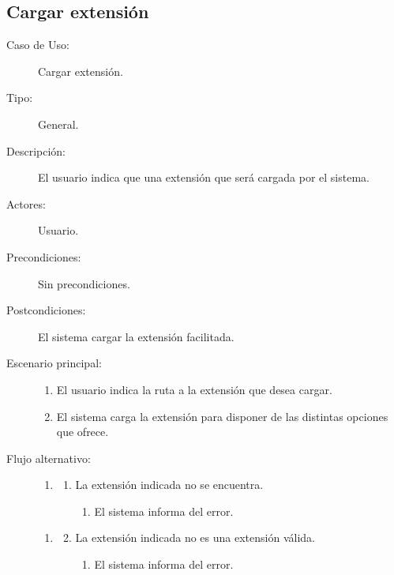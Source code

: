 \subsection{Cargar extensión}
\begin{framed}
\FloatBarrier
\begin{description}
   \item[Caso de Uso:]  Cargar extensión.
   \item[Tipo:] General.
   \item[Descripción:] 
   El usuario indica que una extensión que será cargada por
   el sistema.
   \item[Actores:] 
   Usuario.
   \item[Precondiciones:] 
   Sin precondiciones.
   \item[Postcondiciones:] 
   El sistema cargar la extensión facilitada.
   \item[Escenario principal:] \hfill
   \begin{enumerate}
   \item El usuario indica la ruta a la extensión que desea cargar.
   \item El sistema carga la extensión para disponer de las distintas opciones que 
   ofrece. 
   \end{enumerate}
   \item[Flujo alternativo:] \hfill 
   \begin{enumerate} \itemsep1pt \parskip0pt 
   \setcounter{enumi}{1}
   \renewcommand{\labelenumi}{}
   \renewcommand{\labelenumiii}{\arabic{enumiii}.}
   \renewcommand{\labelenumii}{\arabic{enumi}\alph{enumii}.}
      \item 
      \begin {enumerate}
         \setcounter{enumii}{0}
         \item La extensión indicada no se encuentra.
         \begin{enumerate}
         \item El sistema informa del error.
         \end{enumerate}
      \end{enumerate}
   \end{enumerate}
   \begin{enumerate} \itemsep1pt \parskip0pt 
   \setcounter{enumi}{1}
   \renewcommand{\labelenumi}{}
   \renewcommand{\labelenumiii}{\arabic{enumiii}.}
   \renewcommand{\labelenumii}{\arabic{enumi}\alph{enumii}.}
      \item 
      \begin {enumerate}
         \setcounter{enumii}{1}
         \item La extensión indicada no es una extensión válida.
         \begin{enumerate}
         \item El sistema informa del error.
         \end{enumerate}
      \end{enumerate}
   \end{enumerate}
\end{description}
 \FloatBarrier
\end{framed}

